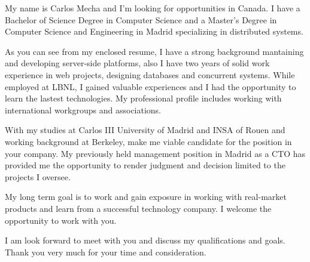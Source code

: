 My name is Carlos Mecha and I'm looking for opportunities in Canada. I have a Bachelor of Science Degree in Computer Science and a Master's Degree in Computer Science and Engineering in Madrid specializing in distributed systems.

As you can see from my enclosed resume, I have a strong background mantaining and developing server-side platforms, also I have two years of solid work experience in web projects, designing databases and concurrent systems. While employed at LBNL, I gained valuable experiences and I had the opportunity to learn the lastest technologies. My professional profile includes working with international workgroups and associations. 

With my studies at Carlos III University of Madrid and INSA of Rouen and working background at Berkeley, make me viable candidate for the \textbf{\thePosition} position in your company. My previously held management position in Madrid as a CTO has provided me the opportunity to render judgment and decision limited to the projects I oversee.

My long term goal is to work and gain exposure in working with real-market products and learn from a successful technology company. I welcome the opportunity to work with you.

I am look forward to meet with you and discuss my qualifications and goals. Thank you very much for your time and consideration.
